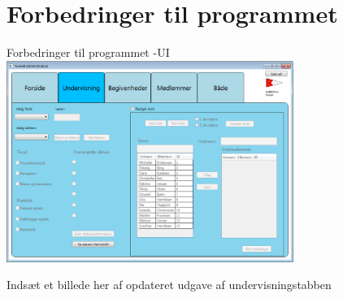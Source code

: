 \section{Forbedringer til programmet}

\begin{frame}{Forbedringer til programmet -UI}
 \includegraphics[width=0.70\textwidth]{images/undervisning.png}

Indsæt et billede her af opdateret udgave af undervisningstabben
\end{frame}